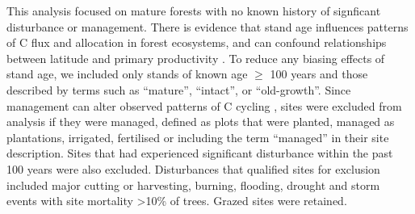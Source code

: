 \documentclass[
]{article}
\begin{document}
This analysis focused on mature forests with no known history of
signficant disturbance or management. There is evidence that stand age
influences patterns of C flux and allocation in forest ecosystems, and
can confound relationships between latitude and primary productivity
\citep{de_lucia_forest_2007, gillman_latitude_2015}. To reduce any
biasing effects of stand age, we included only stands of known age
\(\ge\) 100 years and those described by terms such as ``mature'',
``intact'', or ``old-growth''. Since management can alter observed
patterns of C cycling \citep{simova_enigma_2017}, sites were excluded
from analysis if they were managed, defined as plots that were planted,
managed as plantations, irrigated, fertilised or including the term
``managed'' in their site description. Sites that had experienced
significant disturbance within the past 100 years were also excluded.
Disturbances that qualified sites for exclusion included major cutting
or harvesting, burning, flooding, drought and storm events with site
mortality \textgreater10\% of trees. Grazed sites were retained.
\end{document}
